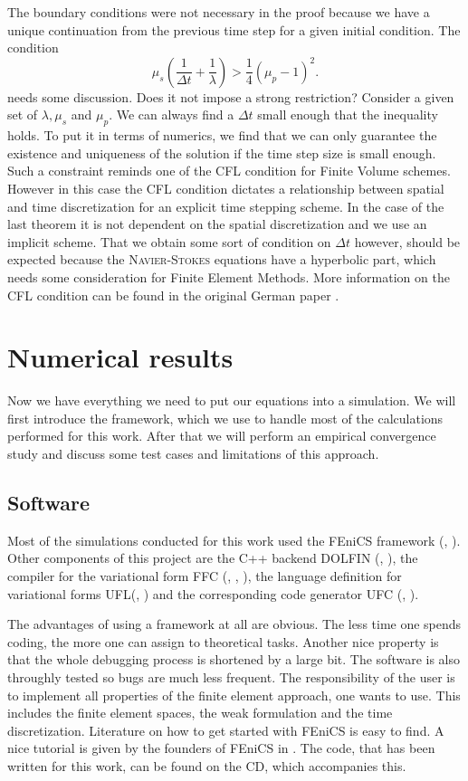 \documentclass[12pt,a4paper,twoside, open=right]{scrreprt}
\theoremstyle{definition}
\theoremstyle{plain}
\begin{document}
The boundary conditions were not necessary in the proof because we have a unique continuation from the previous time step for a given initial condition. The condition 
\begin{equation}
\mu_s\left(\frac{1}{\Delta t}+\frac{1}{\lambda}\right)>\frac{1}{4}(\mu_p-1)^2.
\end{equation} needs some discussion. Does it not impose a strong restriction? Consider a given set of $\lambda,\mu_s$ and $\mu_p$. We can always find a $\Delta t$ small enough that the inequality holds.  To put it in terms of numerics, we find that we can only guarantee the existence and uniqueness of the solution if the time step size is small enough. Such a constraint reminds one of the \textsc{CFL} condition for Finite Volume schemes. However in this case the \textsc{CFL} condition dictates a relationship between spatial and time discretization for an explicit time stepping scheme. In the case of the last theorem it is not dependent on the spatial discretization and we use an implicit scheme. That we obtain some sort of condition on $\Delta t$ however, should be expected because the \textsc{Navier-Stokes} equations have a hyperbolic part, which needs some consideration for Finite Element Methods. More information on the CFL condition can be found in the original German paper \cite{Courant1928}.
\section{Numerical results}
Now we have everything we need to put our equations into a simulation. We will first introduce the framework, which we use to handle most of the calculations performed for this work. After that we will perform an empirical convergence study and discuss some test cases and limitations of this approach.
\subsection{Software}
Most of the simulations conducted for this work used the FEniCS framework (\cite{AlnaesBlechta2015a}, \cite{LoggMardalEtAl2012a}). Other components of this project are the C++ backend DOLFIN (\cite{LoggWells2010a}, \cite{LoggWellsEtAl2012a}), the compiler for the variational form FFC (\cite{KirbyLogg2006a}, \cite{LoggOlgaardEtAl2012a}, \cite{OlgaardWells2010b}), the language definition for variational forms UFL(\cite{AlnaesEtAl2012}, \cite{Alnaes2012a}) and the corresponding code generator UFC (\cite{AlnaesLoggEtAl2009a}, \cite{AlnaesLoggEtAl2012a}).
\par 
The advantages of using a framework at all are obvious. The less time one spends coding, the more one can assign to theoretical tasks. Another nice property is that the whole debugging process is shortened by a large bit. The software is also throughly tested so bugs are much less frequent. The responsibility of the user is to implement all properties of the finite element approach, one wants to use. This includes the finite element spaces, the weak formulation and the time discretization. Literature on how to get started with FEniCS is easy to find. A nice tutorial is given by the founders of FEniCS in  \cite{Langtangen2017a}. The code, that has been written for this work, can be found on the CD, which accompanies this. 
\end{document}
